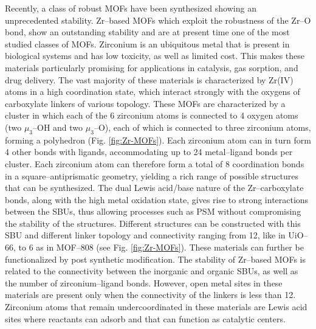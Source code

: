Recently, a class of robust MOFs have been synthesized showing an unprecedented stability\cite{furukawa2014water}. Zr--based MOFs\cite{bai2016zr} which exploit the robustness of the Zr--O bond, show an outstanding stability and are at present time one of the most studied classes of MOFs. Zirconium is an ubiquitous metal that is present in biological systems and has low toxicity, as well as limited cost. This makes these materials particularly promising for applications in catalysis, gas sorption, and drug delivery. The vast majority of these materials is characterized by Zr(IV) atoms in a high coordination state, which interact strongly with the oxygens of carboxylate linkers of various topology. These MOFs are characterized by a  cluster in which each of the 6 zirconium atoms is connected to 4 oxygen atoms (two $\mu_3$--OH and two $\mu_3$--O), each of which is connected to three zirconium atoms, forming a polyhedron (Fig. \ref{fig:Zr-MOFs}). Each zirconium atom can in turn form 4 other bonds with ligands, accommodating up to 24 metal--ligand bonds per cluster. Each zirconium atom can therefore form a total of 8 coordination bonds in a square--antiprismatic geometry, yielding a rich range of possible structures that can be synthesized. The dual Lewis acid/base nature of the Zr--carboxylate bonds, along with the high metal oxidation state, gives rise to strong interactions between the SBUs, thus allowing processes such as PSM without compromising the stability of the structures. Different structures can be constructed with this SBU and different linker topology and connectivity ranging from 12, like in UiO--66, to 6 as in MOF--808 (see Fig. \ref{fig:Zr-MOFs}). These materials can further be functionalized by post synthetic modification. 
The stability of Zr--based MOFs is related to the connectivity between the inorganic and organic SBUs, as well as the number of zirconium--ligand bonds. However, open metal sites in these materials are present only when the connectivity of the linkers is less than 12. Zirconium atoms that remain undercoordinated in these materials are Lewis acid sites where reactants can adsorb and that can function as catalytic centers.


